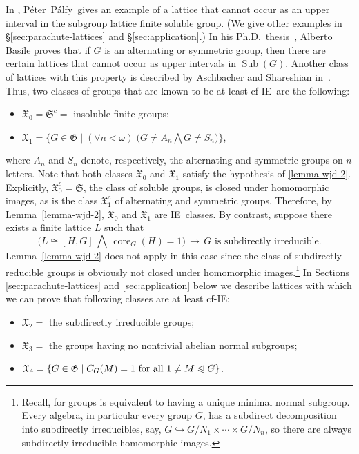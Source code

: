\documentclass[11pt]{amsart}
\theoremstyle{plain}
\theoremstyle{definition}
\theoremstyle{remark}
\numberwithin{theorem}{section}
\numberwithin{claim}{section}
\numberwithin{equation}{section}
\numberwithin{conjecture}{section}
\newcommand{\Peter}{P{\'e}ter}
\newcommand{\Palfy}{P\'alfy}
\newcommand{\<}{\ensuremath{\langle}}
\renewcommand{\>}{\ensuremath{\rangle}}
\newcommand{\subnormal}{\ensuremath{\trianglelefteqslant}}
\newcommand{\Meet}{\ensuremath{\bigwedge}}
\newcommand{\Sub}{\ensuremath{\operatorname{Sub}}}
\newcommand{\core}{\ensuremath{\operatorname{core}}}
\newcommand{\0}{\ensuremath{\mathbf{0}}}
\newcommand{\1}{\ensuremath{\mathbf{1}}}
\newcommand{\2}{\ensuremath{\mathbf{2}}}
\newcommand{\3}{\ensuremath{\mathbf{3}}}
\newcommand{\4}{\ensuremath{\mathbf{4}}}
\newcommand{\5}{\ensuremath{\mathbf{5}}}
\newcommand{\sG}{\ensuremath{\mathfrak{X}}}
\newcommand{\G}{\ensuremath{\mathfrak{G}}}
\newcommand{\IE}{{\small IE}}
\begin{document}
In \cite{Palfy:1995}, \Peter\ \Palfy\ gives an example of a lattice that cannot occur as an
upper interval in the subgroup lattice finite soluble group.  (We give other examples
in \S\ref{sec:parachute-lattices} and \S\ref{sec:application}.)
In his Ph.D.~thesis~\cite{Basile:2001}, Alberto Basile proves that if
$G$ is an alternating or symmetric group, then there are certain lattices that
cannot occur as upper intervals in $\Sub(G)$. Another class of lattices with
this property is described by Aschbacher and Shareshian in~\cite{Aschbacher:2009}. 
Thus, two classes of groups that are known to be at least cf-\IE\ are the following:
\begin{itemize}
\item $\sG_0 = \mathfrak{S}^c = $ insoluble finite groups;
\item $\sG_1 =\bigl\{G\in \G \mid (\forall n<\omega) \; \bigl(G \neq A_n \Meet  G\neq S_n\bigr) \bigr\}$,
\end{itemize}
where $A_n$ and $S_n$ denote, respectively,
the alternating and symmetric groups on
$n$ letters.
Note that both classes $\sG_0$ and $\sG_1$ satisfy the hypothesis of \ref{lemma-wjd-2}.
Explicitly, $\sG_0^c = \mathfrak{S}$, the class of soluble groups, is closed under homomorphic
images, as is the class $\sG_1^c$ of alternating and symmetric groups. 
Therefore, by Lemma~\ref{lemma-wjd-2}, $\sG_0$ and $\sG_1$ are \IE\ classes.
By contrast, suppose %
there exists a finite lattice $L$ such that
 \[
 \bigl(L \cong [H, G] \,\Meet\, \core_G(H)=1\bigr) \, \longrightarrow \, G
 \text{ is subdirectly irreducible.}  %
\]
Lemma~\ref{lemma-wjd-2} does not apply in this case since the class of
subdirectly reducible groups is obviously not closed under homomorphic 
images.\footnote{Recall, for groups  is equivalent
  to having a unique minimal normal subgroup.
 Every algebra, in particular every group $G$, has a subdirect
  decomposition into subdirectly irreducibles, say, $G\hookrightarrow G/N_1 \times \cdots\times
  G/N_n$, so there are always  subdirectly irreducible homomorphic images.}
In Sections \ref{sec:parachute-lattices} and \ref{sec:application} below we describe
lattices with which we can prove that following classes are at least 
cf-\IE: 
\begin{itemize}
\item $\sG_2 = $ the subdirectly irreducible groups;
\item $\sG_3 = $ the groups having no nontrivial abelian normal subgroups;
\item $\sG_4 = \{G\in \G \mid C_G(M) = 1 \text{ for all } 1\neq M\subnormal G\}$.
\end{itemize}
\end{document}
